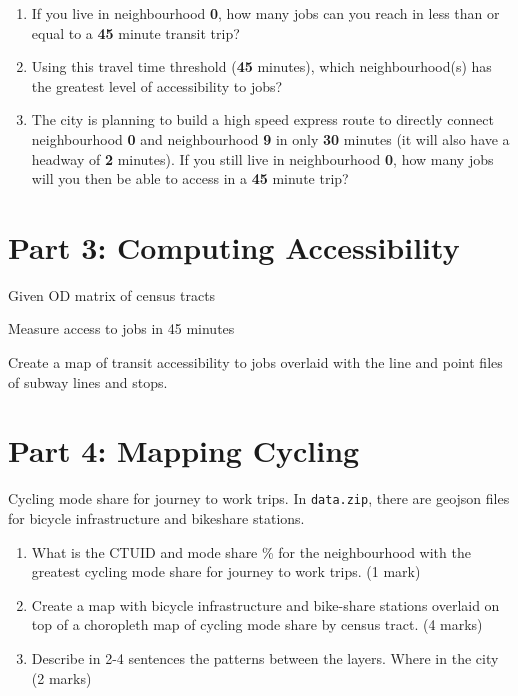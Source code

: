 \documentclass[11pt]{article}
\begin{document}
	\begin{enumerate}
		
		
		\item If you live in neighbourhood \textbf{0}, how many jobs can you reach in less than or equal to a \textbf{45} minute transit trip?
		
		\item Using this travel time threshold (\textbf{45} minutes), which neighbourhood(s) has the greatest level of accessibility to jobs?
		
		\item The city is planning to build a high speed express route to directly connect neighbourhood \textbf{0} and neighbourhood \textbf{9} in only \textbf{30} minutes (it will also have a headway of \textbf{2} minutes). If you still live in neighbourhood \textbf{0}, how many jobs will you then be able to access in a \textbf{45} minute trip?
		
	\end{enumerate}


	
	
	
	\section*{Part 3: Computing Accessibility}
	
	Given OD matrix of census tracts
	
	Measure access to jobs in 45 minutes
	
	Create a map of transit accessibility to jobs overlaid with the line and point files of subway lines and stops.
	
	
	
	
	
	
	
	\section*{Part 4: Mapping Cycling}
	
	Cycling mode share for journey to work trips. In \texttt{data.zip}, there are geojson files for bicycle infrastructure and bikeshare stations.
	
	
	\begin{enumerate}
		\item What is the CTUID and mode share \% for the neighbourhood with the greatest cycling mode share for journey to work trips. (1 mark)
		
		\item Create a map with bicycle infrastructure and bike-share stations overlaid on top of a choropleth map of cycling mode share by census tract. (4 marks)
		
		\item Describe in 2-4 sentences the patterns between the layers. Where in the city (2 marks)
		
	\end{enumerate}
	
	
	
	
	
	
\end{document}
